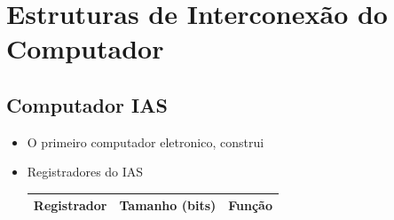 \documentclass[12pt]{article}
\begin{document}
\section{Estruturas de Interconexão do Computador}
    \subsection{Computador IAS}

    \begin{itemize}
        \item O primeiro computador eletronico, construi
        \item Registradores do IAS
        \begin{table}[H]
            \begin{center}
            \begin{tabular}{|p{6cm}|p{1.75cm}|p{6cm}|}
                \hline
                Registrador & Tamanho (bits) & Função \\ \hline
                

\end{tabular}
\end{center}
\end{table}
\end{itemize}
\end{document}
